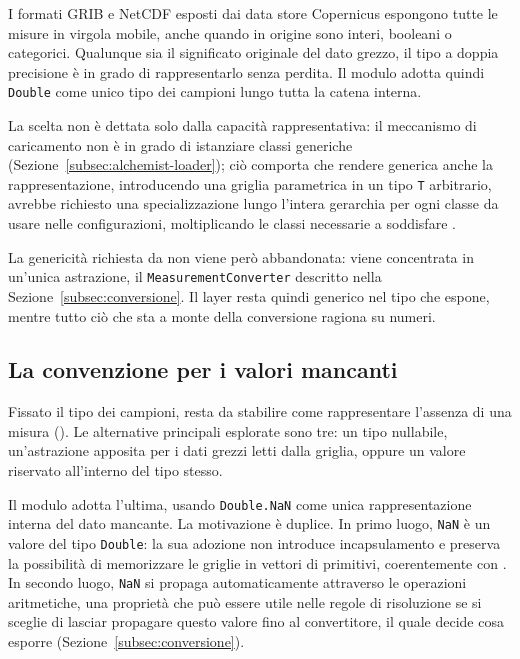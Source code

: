 I formati \ac{GRIB} e \ac{NetCDF} esposti dai data store Copernicus espongono
tutte le misure in virgola mobile, anche quando in origine sono
interi, booleani o categorici. Qualunque sia il significato originale del dato grezzo,
il tipo a doppia precisione è in grado di rappresentarlo senza perdita. Il modulo
adotta quindi \texttt{Double} come unico tipo dei campioni lungo tutta la catena
interna.

La scelta non è dettata solo dalla capacità rappresentativa:
il meccanismo di caricamento non è in grado di istanziare classi generiche (Sezione~\ref{subsec:alchemist-loader});
ciò comporta che rendere generica anche la rappresentazione,
introducendo una griglia parametrica in un tipo \texttt{T} arbitrario, avrebbe
richiesto una specializzazione lungo l'intera gerarchia
per ogni classe da usare nelle configurazioni,
moltiplicando le classi necessarie a soddisfare .

La genericità richiesta da  non viene però abbandonata: viene concentrata in
un'unica astrazione, il \texttt{MeasurementConverter} descritto nella
Sezione~\ref{subsec:conversione}. Il layer resta quindi generico nel tipo che espone,
mentre tutto ciò che sta a monte della conversione ragiona su numeri.

\subsection{La convenzione per i valori mancanti}
\label{subsec:convenzione-mancanti}

Fissato il tipo dei campioni, resta da stabilire come rappresentare l'assenza di una
misura (). Le alternative principali
esplorate sono tre: un tipo nullabile, un'astrazione apposita per i dati grezzi letti
dalla griglia, oppure un valore riservato all'interno del tipo stesso.

Il modulo adotta l'ultima, usando \texttt{Double.NaN} come unica rappresentazione interna
del dato mancante. La motivazione è duplice. In primo luogo, \texttt{NaN} è un valore del
tipo \texttt{Double}: la sua adozione non introduce incapsulamento e preserva la
possibilità di memorizzare le griglie in vettori di primitivi, coerentemente con
. In secondo luogo, \texttt{NaN} si propaga automaticamente attraverso le
operazioni aritmetiche, una proprietà che può essere utile nelle regole di risoluzione se
si sceglie di lasciar propagare questo valore fino al convertitore, il quale decide cosa
esporre (Sezione~\ref{subsec:conversione}).

